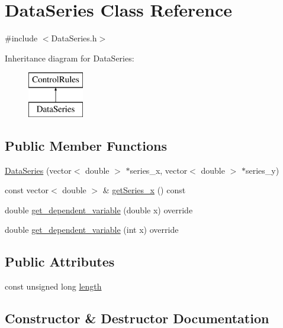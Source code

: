\hypertarget{classDataSeries}{}\section{Data\+Series Class Reference}
\label{classDataSeries}


{\ttfamily \#include $<$Data\+Series.\+h$>$}

Inheritance diagram for Data\+Series\+:\begin{figure}[H]
\begin{center}
\leavevmode
\includegraphics[height=2.000000cm]{classDataSeries}
\end{center}
\end{figure}
\subsection*{Public Member Functions}
\begin{DoxyCompactItemize}
\item 
\mbox{\hyperlink{classDataSeries_a8af4ff388a574c8b836c2880492a8423}{Data\+Series}} (vector$<$ double $>$ $\ast$series\+\_\+x, vector$<$ double $>$ $\ast$series\+\_\+y)
\item 
const vector$<$ double $>$ \& \mbox{\hyperlink{classDataSeries_a0a1f6248bc7bed18587e28f307066307}{get\+Series\+\_\+x}} () const
\item 
double \mbox{\hyperlink{classDataSeries_a3cb684ebcbdd6d9969996f306bed8b53}{get\+\_\+dependent\+\_\+variable}} (double x) override
\item 
double \mbox{\hyperlink{classDataSeries_a57c3737304a489a3ae9cae5910fc5337}{get\+\_\+dependent\+\_\+variable}} (int x) override
\end{DoxyCompactItemize}
\subsection*{Public Attributes}
\begin{DoxyCompactItemize}
\item 
const unsigned long \mbox{\hyperlink{classDataSeries_ad4a99b265519d2f57b787c03f2cf2f83}{length}}
\end{DoxyCompactItemize}


\subsection{Constructor \& Destructor Documentation}
\mbox{\label{classDataSeries_a8af4ff388a574c8b836c2880492a8423}} 
